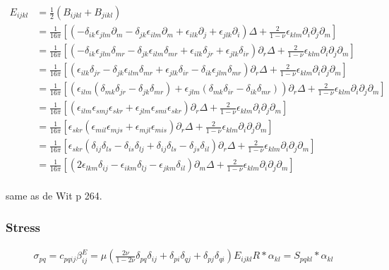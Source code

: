 \begin{align}
E_{ijkl}&=\frac{1}{2}\left(B_{ijkl}+B_{jikl}\right)\nonumber\\
&=\frac{1}{16\pi}\left[\left(-\delta_{ik}\epsilon_{jlm}\partial_m-\delta_{jk}\epsilon_{ilm}\partial_m+\epsilon_{ilk}\partial_j+\epsilon_{jlk}\partial_i\right)\Delta+\frac{2}{1-\nu}\epsilon_{klm}\partial_i\partial_j\partial_m\right]\nonumber\\
&=\frac{1}{16\pi}\left[\left(-\delta_{ik}\epsilon_{jlm}\delta_{mr}-\delta_{jk}\epsilon_{ilm}\delta_{mr}+\epsilon_{ilk}\delta_{jr}+\epsilon_{jlk}\delta_{ir}\right)\partial_r\Delta+\frac{2}{1-\nu}\epsilon_{klm}\partial_i\partial_j\partial_m\right]\nonumber\\
&=\frac{1}{16\pi}\left[\left(\epsilon_{ilk}\delta_{jr}-\delta_{jk}\epsilon_{ilm}\delta_{mr}+\epsilon_{jlk}\delta_{ir}-\delta_{ik}\epsilon_{jlm}\delta_{mr}\right)\partial_r\Delta+\frac{2}{1-\nu}\epsilon_{klm}\partial_i\partial_j\partial_m\right]\nonumber\\
&=\frac{1}{16\pi}\left[\left(\epsilon_{ilm}(\delta_{mk}\delta_{jr}-\delta_{jk}\delta_{mr})+\epsilon_{jlm}(\delta_{mk}\delta_{ir}-\delta_{ik}\delta_{mr})\right)\partial_r\Delta+\frac{2}{1-\nu}\epsilon_{klm}\partial_i\partial_j\partial_m\right]\nonumber\\
&=\frac{1}{16\pi}\left[\left(\epsilon_{ilm}\epsilon_{smj}\epsilon_{skr}+\epsilon_{jlm}\epsilon_{smi}\epsilon_{skr}\right)\partial_r\Delta+\frac{2}{1-\nu}\epsilon_{klm}\partial_i\partial_j\partial_m\right]\nonumber\\
&=\frac{1}{16\pi}\left[\epsilon_{skr}\left(\epsilon_{mil}\epsilon_{mjs}+\epsilon_{mjl}\epsilon_{mis}\right)\partial_r\Delta+\frac{2}{1-\nu}\epsilon_{klm}\partial_i\partial_j\partial_m\right]\nonumber\\
&=\frac{1}{16\pi}\left[\epsilon_{skr}\left(\delta_{ij}\delta_{ls}-\delta_{is}\delta_{lj}+\delta_{ij}\delta_{ls}-\delta_{js}\delta_{il}\right)\partial_r\Delta+\frac{2}{1-\nu}\epsilon_{klm}\partial_i\partial_j\partial_m\right]\nonumber\\
&=\frac{1}{16\pi}\left[\left(2\epsilon_{lkm}\delta_{ij}-\epsilon_{ikm}\delta_{lj}-\epsilon_{jkm}\delta_{il}\right)\partial_m\Delta+\frac{2}{1-\nu}\epsilon_{klm}\partial_i\partial_j\partial_m\right]\nonumber\\
\end{align}

same as de Wit p 264.

\subsubsection{Stress}
\begin{align}
\sigma_{pq}=c_{pqij}\beta^E_{ij}=
\mu\left(\frac{2\nu}{1-2\nu}\delta_{pq}\delta_{ij}+\delta_{pi}\delta_{qj}+\delta_{pj}\delta_{qi}\right)E_{ijkl}R*\alpha_{kl}=S_{pqkl}*\alpha_{kl}
\end{align}

